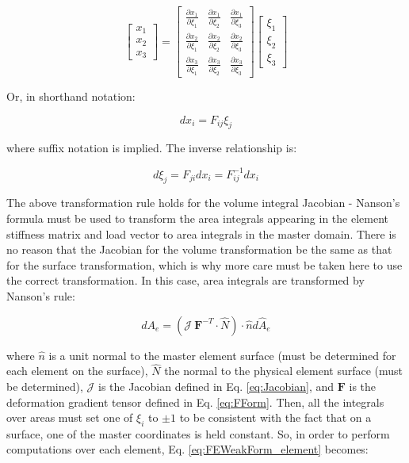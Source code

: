 \documentclass[10pt]{article}
\begin{document}
\begin{equation}
\label{eq:FForm}
\begin{bmatrix}x_1\\x_2\\x_3\end{bmatrix}=
\begin{bmatrix}\frac{\partial x_1}{\partial \xi_1}&\frac{\partial x_1}{\partial \xi_2}&\frac{\partial x_1}{\partial \xi_3}\\
\frac{\partial x_2}{\partial \xi_1}&\frac{\partial x_2}{\partial \xi_2}&\frac{\partial x_2}{\partial \xi_3}\\
\frac{\partial x_3}{\partial \xi_1}&\frac{\partial x_3}{\partial \xi_2}&\frac{\partial x_3}{\partial \xi_3}\end{bmatrix}
\begin{bmatrix}\xi_1\\\xi_2\\\xi_3\end{bmatrix}
\end{equation}

Or, in shorthand notation:

\begin{equation}
dx_i=F_{ij}\xi_j
\end{equation}

where suffix notation is implied. The inverse relationship is:

\begin{equation}
d\xi_j=F_{ji}dx_i=F_{ij}^{-1}dx_i
\end{equation}

The above transformation rule holds for the volume integral Jacobian - Nanson's formula must be used to transform the area integrals appearing in the element stiffness matrix and load vector to area integrals in the master domain. There is no reason that the Jacobian for the volume transformation be the same as that for the surface transformation, which is why more care must be taken here to use the correct transformation. In this case, area integrals are transformed by Nanson's rule:

\begin{equation}
\label{eq:Nanson}
dA_e=(\mathscr{J}\ \textbf{F}^{-T}\cdot\hat{N})\cdot\hat{n}d\hat{A}_e
\end{equation}

where \(\hat{n}\) is a unit normal to the master element surface (must be determined for each element on the surface), \(\hat{N}\) the normal to the physical element surface (must be determined), \(\mathscr{J}\) is the Jacobian defined in Eq. \eqref{eq:Jacobian}, and \(\textbf{F}\) is the deformation gradient tensor defined in Eq. \eqref{eq:FForm}. Then, all the integrals over areas must set one of \(\xi_i\) to \(\pm1\) to be consistent with the fact that on a surface, one of the master coordinates is held constant. So, in order to perform computations over each element, Eq. \eqref{eq:FEWeakForm_element} becomes:
\end{document}
